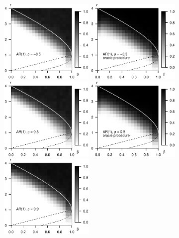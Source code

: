 \begin{figure}
    \centering
    \includegraphics[width=0.4\textwidth]{./figures/simulated_boundaries/simulated_phase_diagram_AR-05_p10000.eps}
    \includegraphics[width=0.4\textwidth]{./figures/simulated_boundaries/simulated_phase_diagram_AR-05_p10000_oracle.eps}
    \includegraphics[width=0.4\textwidth]{./figures/simulated_boundaries/simulated_phase_diagram_AR05_p10000.eps}
    \includegraphics[width=0.4\textwidth]{./figures/simulated_boundaries/simulated_phase_diagram_AR05_p10000_oracle.eps}
    \includegraphics[width=0.4\textwidth]{./figures/simulated_boundaries/simulated_phase_diagram_AR09_p10000.eps}

\end{figure}
